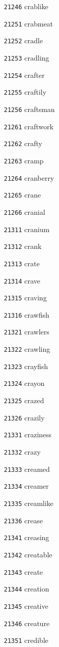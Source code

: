 \documentclass[twoside,11pt]{article}
\begin{document}
\begin{multicols}{5}
\begin{enumerate}
\item[\texttt{21246}] crablike
\item[\texttt{21251}] crabmeat
\item[\texttt{21252}] cradle
\item[\texttt{21253}] cradling
\item[\texttt{21254}] crafter
\item[\texttt{21255}] craftily
\item[\texttt{21256}] craftsman
\item[\texttt{21261}] craftwork
\item[\texttt{21262}] crafty
\item[\texttt{21263}] cramp
\item[\texttt{21264}] cranberry
\item[\texttt{21265}] crane
\item[\texttt{21266}] cranial
\item[\texttt{21311}] cranium
\item[\texttt{21312}] crank
\item[\texttt{21313}] crate
\item[\texttt{21314}] crave
\item[\texttt{21315}] craving
\item[\texttt{21316}] crawfish
\item[\texttt{21321}] crawlers
\item[\texttt{21322}] crawling
\item[\texttt{21323}] crayfish
\item[\texttt{21324}] crayon
\item[\texttt{21325}] crazed
\item[\texttt{21326}] crazily
\item[\texttt{21331}] craziness
\item[\texttt{21332}] crazy
\item[\texttt{21333}] creamed
\item[\texttt{21334}] creamer
\item[\texttt{21335}] creamlike
\item[\texttt{21336}] crease
\item[\texttt{21341}] creasing
\item[\texttt{21342}] creatable
\item[\texttt{21343}] create
\item[\texttt{21344}] creation
\item[\texttt{21345}] creative
\item[\texttt{21346}] creature
\item[\texttt{21351}] credible

\end{enumerate}
\end{multicols}
\end{document}
